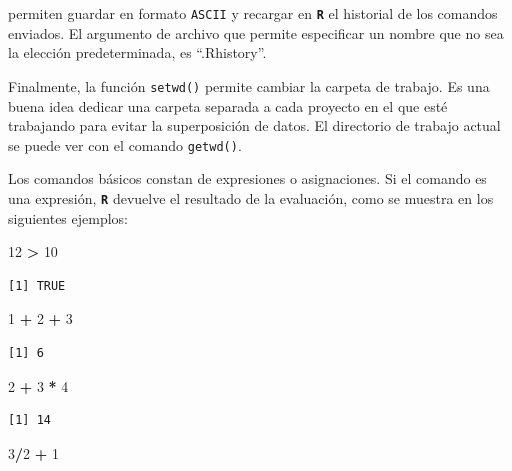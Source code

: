 \documentclass[
]{article}
\newenvironment{Shaded}{\begin{snugshade}}{\end{snugshade}}
\newcommand{\DecValTok}[1]{\textcolor[rgb]{0.00,0.00,0.81}{#1}}
\newcommand{\SpecialCharTok}[1]{\textcolor[rgb]{0.81,0.36,0.00}{\textbf{#1}}}
\begin{document}
permiten guardar en formato \texttt{ASCII} y recargar en \textbf{\texttt{R}} el historial de los comandos enviados. El argumento de archivo que permite especificar un nombre que no sea la elección predeterminada, es ``.Rhistory''.

Finalmente, la función \texttt{setwd()} permite cambiar la carpeta de trabajo. Es una buena idea dedicar una carpeta separada a cada proyecto en el que esté trabajando para evitar la superposición de datos. El directorio de trabajo actual se puede ver con el comando \texttt{getwd()}.

Los comandos básicos constan de expresiones o asignaciones. Si el comando es una expresión, \textbf{\texttt{R}} devuelve el resultado de la evaluación, como se muestra en los siguientes ejemplos:

\begin{Shaded}
\begin{Highlighting}[]
\DecValTok{12} \SpecialCharTok{\textgreater{}} \DecValTok{10}
\end{Highlighting}
\end{Shaded}

\begin{verbatim}
[1] TRUE
\end{verbatim}

\begin{Shaded}
\begin{Highlighting}[]
\DecValTok{1} \SpecialCharTok{+} \DecValTok{2} \SpecialCharTok{+} \DecValTok{3}
\end{Highlighting}
\end{Shaded}

\begin{verbatim}
[1] 6
\end{verbatim}

\begin{Shaded}
\begin{Highlighting}[]
\DecValTok{2} \SpecialCharTok{+} \DecValTok{3} \SpecialCharTok{*} \DecValTok{4}
\end{Highlighting}
\end{Shaded}

\begin{verbatim}
[1] 14
\end{verbatim}

\begin{Shaded}
\begin{Highlighting}[]
\DecValTok{3}\SpecialCharTok{/}\DecValTok{2} \SpecialCharTok{+} \DecValTok{1}
\end{Highlighting}
\end{Shaded}
\end{document}
